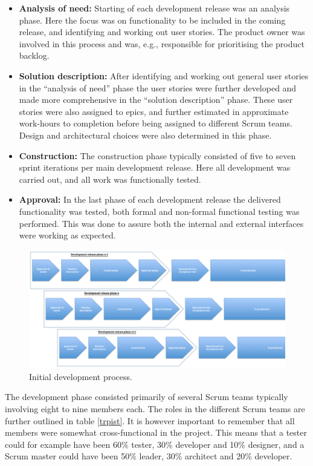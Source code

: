 \begin{itemize}
   \item \textbf{Analysis of need:} Starting of each development release was an analysis phase. Here the focus was on functionality to be included in the coming release, and identifying and working out user stories. The product owner was involved in this process and was, e.g., responsible for prioritising the product backlog.
   \item \textbf{Solution description:} After identifying and working out general user stories in the ``analysis of need'' phase the user stories were further developed and made more comprehensive in the ``solution description'' phase. These user stories were also assigned to epics, and further estimated in approximate work-hours to completion before being assigned to different Scrum teams. Design and architectural choices were also determined in this phase.
   \item \textbf{Construction:} The construction phase typically consisted of five to seven sprint iterations per main development release. Here all development was carried out, and all work was functionally tested.
   \item \textbf{Approval:} In the last phase of each development release the delivered functionality was tested, both formal and non-formal functional testing was performed. This was done to assure both the internal and external interfaces were working as expected.
\end{itemize}

\begin{figure}[H]
\centering
\includegraphics[trim = 0mm 0mm 0mm 0mm,width=155mm]{images/initial_development_process}
\caption{Initial development process.}
\label{initial_development_process}
\end{figure}

The development phase consisted primarily of several Scrum teams typically involving eight to nine members each. The roles in the different Scrum teams are further outlined in table \ref{trpist}. It is however important to remember that all members were somewhat cross-functional in the project. This means that a tester could for example have been 60\% tester, 30\% developer and 10\% designer, and a Scrum master could have been 50\% leader, 30\% architect and 20\% developer. 

